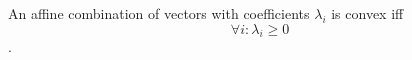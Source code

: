 An affine combination of vectors with coefficients $\lambda_i$ is convex iff $$\forall i : \lambda_i \geq 0$$.
